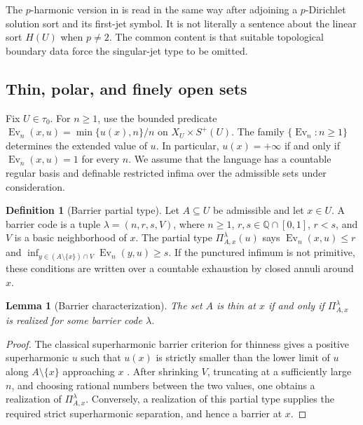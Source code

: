 \documentclass{amsart}
\newtheorem{lemma}[theorem]{Lemma}
\theoremstyle{definition}
\newtheorem{definition}{Definition}[section]
\theoremstyle{remark}
\numberwithin{equation}{section}
\begin{document}
The $p$-harmonic version in \cite{IwaniecOnninen2019RKC} is read in the same
way after adjoining a $p$-Dirichlet solution sort and its first-jet symbol. It
is not literally a sentence about the linear sort $H(U)$ when $p\ne2$. The
common content is that suitable topological boundary data force the
singular-jet type to be omitted.

\subsection{Thin, polar, and finely open sets}

Fix $U\in\tau_0$. For $n\ge1$, use the bounded predicate
$\operatorname{Ev}_n(x,u)=\min\{u(x),n\}/n$ on $X_U\times S^+(U)$. The family
$\{\operatorname{Ev}_n:n\ge1\}$ determines the extended value of $u$. In
particular, $u(x)=+\infty$ if and only if
$\operatorname{Ev}_n(x,u)=1$ for every $n$. We assume that the language has a
countable regular basis and definable restricted infima over the admissible
sets under consideration.

\begin{definition}[Barrier partial type]
\label{def:barrier-partial-type}
Let $A\subseteq U$ be admissible and let $x\in U$. A barrier code is a tuple
$\lambda=(n,r,s,V)$, where $n\ge1$, $r,s\in\mathbb Q\cap[0,1]$, $r<s$, and
$V$ is a basic neighborhood of $x$. The partial type
$\Pi^\lambda_{A,x}(u)$ says
$\operatorname{Ev}_n(x,u)\le r$ and
$\inf_{y\in(A\setminus\{x\})\cap V}\operatorname{Ev}_n(y,u)\ge s$. If the
punctured infimum is not primitive, these conditions are written over a
countable exhaustion by closed annuli around $x$.
\end{definition}

\begin{lemma}[Barrier characterization]
\label{lem:barrier-characterization-thinness}
The set $A$ is thin at $x$ if and only if
$\Pi^\lambda_{A,x}$ is realized for some barrier code $\lambda$.
\end{lemma}

\begin{proof}
The classical superharmonic barrier criterion for thinness gives a positive
superharmonic $u$ such that $u(x)$ is strictly smaller than the lower limit of
$u$ along $A\setminus\{x\}$ approaching $x$ \cite{doob1984classical}. After
shrinking $V$, truncating at a sufficiently large $n$, and choosing rational
numbers between the two values, one obtains a realization of
$\Pi^\lambda_{A,x}$. Conversely, a realization of this partial type supplies
the required strict superharmonic separation, and hence a barrier at $x$.
\end{proof}
\end{document}
